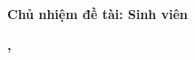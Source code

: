 \begin{reportcover}
\CoverFrame
\centering{}
\CoverHeading
\vspace{18mm}\CoverTitle
\vspace{10mm}\textbf{Chủ nhiệm đề tài: Sinh viên \PrincipalName}\par
\vfill\textbf{\ReportLocation, \ReportDate}\par\vspace{5mm}
\end{reportcover}
